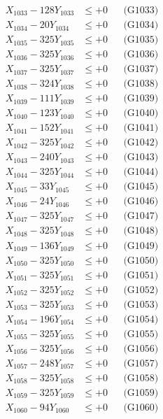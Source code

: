 \documentclass[a4paper,10pt]{article}
\begin{document}
{\begin{align}
X_{1033} - 128Y_{1033} &\leq +0 && \text{(G1033)} \\
X_{1034} - 20Y_{1034} &\leq +0 && \text{(G1034)} \\
X_{1035} - 325Y_{1035} &\leq +0 && \text{(G1035)} \\
X_{1036} - 325Y_{1036} &\leq +0 && \text{(G1036)} \\
X_{1037} - 325Y_{1037} &\leq +0 && \text{(G1037)} \\
X_{1038} - 324Y_{1038} &\leq +0 && \text{(G1038)} \\
X_{1039} - 111Y_{1039} &\leq +0 && \text{(G1039)} \\
X_{1040} - 123Y_{1040} &\leq +0 && \text{(G1040)} \\
\allowbreak
X_{1041} - 152Y_{1041} &\leq +0 && \text{(G1041)} \\
X_{1042} - 325Y_{1042} &\leq +0 && \text{(G1042)} \\
X_{1043} - 240Y_{1043} &\leq +0 && \text{(G1043)} \\
X_{1044} - 325Y_{1044} &\leq +0 && \text{(G1044)} \\
X_{1045} - 33Y_{1045} &\leq +0 && \text{(G1045)} \\
X_{1046} - 24Y_{1046} &\leq +0 && \text{(G1046)} \\
X_{1047} - 325Y_{1047} &\leq +0 && \text{(G1047)} \\
X_{1048} - 325Y_{1048} &\leq +0 && \text{(G1048)} \\
X_{1049} - 136Y_{1049} &\leq +0 && \text{(G1049)} \\
X_{1050} - 325Y_{1050} &\leq +0 && \text{(G1050)} \\
\allowbreak
X_{1051} - 325Y_{1051} &\leq +0 && \text{(G1051)} \\
X_{1052} - 325Y_{1052} &\leq +0 && \text{(G1052)} \\
X_{1053} - 325Y_{1053} &\leq +0 && \text{(G1053)} \\
X_{1054} - 196Y_{1054} &\leq +0 && \text{(G1054)} \\
X_{1055} - 325Y_{1055} &\leq +0 && \text{(G1055)} \\
X_{1056} - 325Y_{1056} &\leq +0 && \text{(G1056)} \\
X_{1057} - 248Y_{1057} &\leq +0 && \text{(G1057)} \\
X_{1058} - 325Y_{1058} &\leq +0 && \text{(G1058)} \\
X_{1059} - 325Y_{1059} &\leq +0 && \text{(G1059)} \\
X_{1060} - 94Y_{1060} &\leq +0 && \text{(G1060)} \\

\end{align}}
\end{document}
